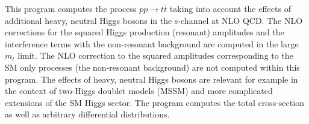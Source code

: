 This program computes the process $ pp \rightarrow t\bar{t} $ taking into account the effects of additional heavy, neutral Higgs bosons in the s-\/channel at N\+L\+O Q\+C\+D. The N\+L\+O corrections for the squared Higgs production (resonant) amplitudes and the interference terms with the non-\/resonant background are computed in the large $ m_t $ limit. The N\+L\+O correction to the squared amplitudes corresponding to the S\+M only processes (the non-\/resonant background) are not computed within this program. The effects of heavy, neutral Higgs bosons are relevant for example in the context of two-\/\+Higgs doublet models (M\+S\+S\+M) and more complicated extensions of the S\+M Higgs sector. The program computes the total cross-\/section as well as arbitrary differential distributions. 